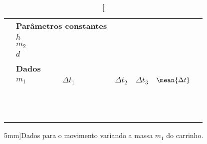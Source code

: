 \begin{table*}[!ht]
\centering
\begin{tabular}{lp{25mm}p{25mm}p{25mm}p{25mm}p{25mm}l}
\toprule
	& \multicolumn{2}{l}{\textbf{Parâmetros constantes}} & \\
	\cmidrule{2-3}
	& $h$ \cellcolor[gray]{0.89} & \cellcolor[gray]{0.92} \\
	& $m_2$ \cellcolor[gray]{0.95} & \cellcolor[gray]{0.97} \\
	& $d$ \cellcolor[gray]{0.89} & \cellcolor[gray]{0.92} \\
	\cmidrule{2-3}
\\
	& \multicolumn{2}{l}{\textbf{Dados}} \\
	\cmidrule{2-6}
	& $m_1$ & $\Delta t_1$ & $\Delta t_2$ & $\Delta t_3$ & $\mean{\Delta t}$ & \\
	\cmidrule{2-6}
	& \cellcolor[gray]{0.89} & \cellcolor[gray]{0.92} & \cellcolor[gray]{0.89} & \cellcolor[gray]{0.92} & \cellcolor[gray]{0.89} \\
	& \cellcolor[gray]{0.95} & \cellcolor[gray]{0.97} & \cellcolor[gray]{0.95} & \cellcolor[gray]{0.97} & \cellcolor[gray]{0.95} \\
		& \cellcolor[gray]{0.89} & \cellcolor[gray]{0.92} & \cellcolor[gray]{0.89} & \cellcolor[gray]{0.92} & \cellcolor[gray]{0.89} \\
	& \cellcolor[gray]{0.95} & \cellcolor[gray]{0.97} & \cellcolor[gray]{0.95} & \cellcolor[gray]{0.97} & \cellcolor[gray]{0.95} \\
		& \cellcolor[gray]{0.89} & \cellcolor[gray]{0.92} & \cellcolor[gray]{0.89} & \cellcolor[gray]{0.92} & \cellcolor[gray]{0.89} \\
	& \cellcolor[gray]{0.95} & \cellcolor[gray]{0.97} & \cellcolor[gray]{0.95} & \cellcolor[gray]{0.97} & \cellcolor[gray]{0.95} \\
		& \cellcolor[gray]{0.89} & \cellcolor[gray]{0.92} & \cellcolor[gray]{0.89} & \cellcolor[gray]{0.92} & \cellcolor[gray]{0.89} \\
	& \cellcolor[gray]{0.95} & \cellcolor[gray]{0.97} & \cellcolor[gray]{0.95} & \cellcolor[gray]{0.97} & \cellcolor[gray]{0.95} \\
		& \cellcolor[gray]{0.89} & \cellcolor[gray]{0.92} & \cellcolor[gray]{0.89} & \cellcolor[gray]{0.92} & \cellcolor[gray]{0.89} \\
	& \cellcolor[gray]{0.95} & \cellcolor[gray]{0.97} & \cellcolor[gray]{0.95} & \cellcolor[gray]{0.97} & \cellcolor[gray]{0.95} \\
		& \cellcolor[gray]{0.89} & \cellcolor[gray]{0.92} & \cellcolor[gray]{0.89} & \cellcolor[gray]{0.92} & \cellcolor[gray]{0.89} \\
	& \cellcolor[gray]{0.95} & \cellcolor[gray]{0.97} & \cellcolor[gray]{0.95} & \cellcolor[gray]{0.97} & \cellcolor[gray]{0.95} \\
	\cmidrule{2-6}
\bottomrule
\end{tabular}
\caption[][5mm]{Dados para o movimento variando a massa $m_1$ do carrinho.}
\label{TabelaDadosEnergiaMecanica1}
\end{table*}
